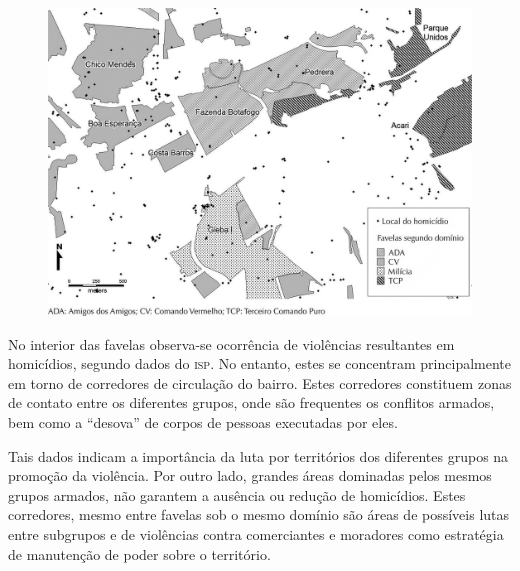 \documentclass{article}
\begin{document}
\begin{figure}
\includegraphics[width=\textwidth]{0034-8910-rsp-48-01-0094-gf03}
\caption{}\label{fig:f03}
\end{figure}

No interior das favelas observa-se ocorrência de violências resultantes em
homicídios, segundo dados do \textsc{isp}. No entanto, estes se concentram principalmente
em torno de corredores de circulação do bairro. Estes corredores constituem
zonas de contato entre os diferentes grupos, onde são frequentes os conflitos
armados, bem como a “desova” de corpos de pessoas executadas por eles.

Tais dados indicam a importância da luta por territórios dos diferentes grupos
na promoção da violência. Por outro lado, grandes áreas dominadas pelos mesmos
grupos armados, não garantem a ausência ou redução de homicídios. Estes
corredores, mesmo entre favelas sob o mesmo domínio são áreas de possíveis lutas
entre subgrupos e de violências contra comerciantes e moradores como estratégia
de manutenção de poder sobre o território.
\end{document}
